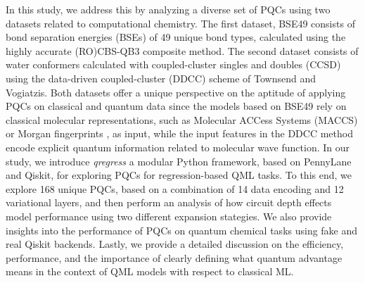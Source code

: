 \documentclass[journal=jacsat,manuscript=article]{achemso}
\begin{document}
In this study, we address this by analyzing a diverse set of PQCs using two datasets related to computational chemistry.
The first dataset, BSE49 consists of bond separation energies (BSEs) of 49 unique bond types, calculated using the highly accurate (RO)CBS-QB3 composite method.\cite{prasad_bse49_2021}
The second dataset consists of water conformers calculated with coupled-cluster singles and doubles (CCSD) using the data-driven coupled-cluster (DDCC) scheme of Townsend and Vogiatzis.\cite{townsend_data-driven_2019,jones_chapter_2023}
Both datasets offer a unique perspective on the aptitude of applying PQCs on classical and quantum data\cite{cerezo_challenges_2022} since the models based on BSE49 rely on classical molecular representations\cite{jones_molecular_2023}, such as Molecular ACCess Systems (MACCS)\cite{durant_reoptimization_2002} or Morgan fingerprints \cite{morgan_generation_1965,rogers_extended-connectivity_2010}, as input, while the input features in the DDCC method encode explicit quantum information related to molecular wave function.
In our study, we introduce \textit{qregress} a modular Python framework, based on PennyLane\cite{bergholm_pennylane_2022} and Qiskit\cite{javadi-abhari_quantum_2024}, for exploring PQCs for regression-based QML tasks.
To this end, we explore 168 unique PQCs, based on a combination of 14 data encoding and 12 variational layers, and then perform an analysis of how circuit depth effects model performance using two different expansion stategies.
We also provide insights into the performance of PQCs on quantum chemical tasks using fake and real Qiskit backends.
Lastly, we provide a detailed discussion on the efficiency, performance, and the importance of clearly defining what quantum advantage means in the context of QML models with respect to classical ML.
\end{document}
